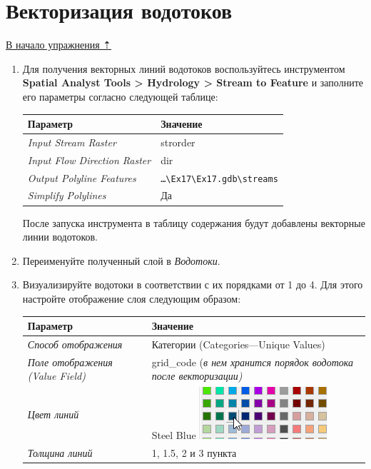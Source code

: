 \documentclass[]{book}
\theoremstyle{definition}
\theoremstyle{definition}
\theoremstyle{definition}
\theoremstyle{remark}
\begin{document}
\hypertarget{dem-vectorize}{%
\section{Векторизация водотоков}\label{dem-vectorize}}

\protect\hyperlink{dem-analysis}{В начало упражнения ⇡}

\begin{enumerate}
\def\labelenumi{\arabic{enumi}.}
\item
  Для получения векторных линий водотоков воспользуйтесь инструментом
  \textbf{Spatial Analyst Tools \textgreater{} Hydrology \textgreater{}
  Stream to Feature} и заполните его параметры согласно следующей
  таблице:

  \begin{longtable}[]{@{}ll@{}}
  \toprule
  Параметр & Значение\tabularnewline
  \midrule
  \endhead
  \emph{Input Stream Raster} & strorder\tabularnewline
  \emph{Input Flow Direction Raster} & dir\tabularnewline
  \emph{Output Polyline Features} &
  \texttt{\ldots{}\textbackslash{}Ex17\textbackslash{}Ex17.gdb\textbackslash{}streams}\tabularnewline
  \emph{Simplify Polylines} & Да\tabularnewline
  \bottomrule
  \end{longtable}

  После запуска инструмента в таблицу содержания будут добавлены
  векторные линии водотоков.
\item
  Переименуйте полученный слой в \emph{Водотоки}.
\item
  Визуализируйте водотоки в соответствии с их порядками от 1 до 4. Для
  этого настройте отображение слоя следующим образом:

  \begin{longtable}[]{@{}ll@{}}
  \toprule
  Параметр & Значение\tabularnewline
  \midrule
  \endhead
  \emph{Способ отображения} & Категории (Categories---Unique
  Values)\tabularnewline
  \emph{Поле отображения (Value Field)} & grid\_code (\emph{в нем
  хранится порядок водотока после векторизации)}\tabularnewline
  \emph{Цвет линий} & Steel Blue
  \includegraphics{images/Ex17/image16.png}\tabularnewline
  \emph{Толщина линий} & 1, 1.5, 2 и 3 пункта\tabularnewline
  \bottomrule
  \end{longtable}


\end{enumerate}
\end{document}
